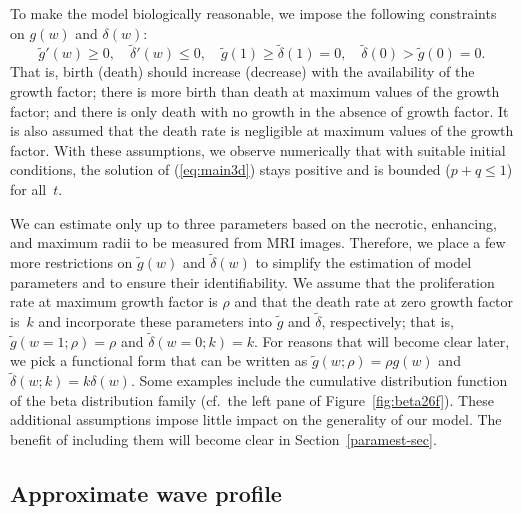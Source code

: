 \documentclass{aims}
\numberwithin{equation}{section}
\begin{document}
To make the model biologically reasonable, we impose the following constraints on $g(w)$ and $\delta(w)$:
\begin{equation}
\tilde{g}'(w)\ge0,\quad
\tilde{\delta}'(w)\le0,\quad
\tilde{g}(1)\ge\tilde{\delta}(1)=0,\quad
\tilde{\delta}(0)>\tilde{g}(0)=0.
\label{eq:1assume}
\end{equation}
That is, birth (death) should increase (decrease) with the availability of
the growth factor; there is more birth than death at maximum values of
the growth factor; and there is only death with no growth in the 
absence of growth factor. 
It is also assumed that the death rate is negligible at maximum values of
the growth factor.  With these assumptions, we observe numerically that with suitable initial conditions, the solution of (\ref{eq:main3d}) stays positive and is bounded ($p+q\le 1$) for all~$t$. 

We can estimate only up to three parameters based on the necrotic,
enhancing, and maximum radii to be measured
from MRI images.  Therefore, we place a few more
restrictions on $\tilde{g}(w)$ and $\tilde{\delta}(w)$ to simplify
the estimation of model parameters and to ensure their identifiability.
We assume that the proliferation rate at maximum growth factor is $\rho$
and that the death rate at zero growth factor
is~$k$ and incorporate these parameters into $\tilde{g}$ and
$\tilde{\delta}$, respectively; that is,
$\tilde{g}(w=1;\rho)=\rho$ and $\tilde{\delta}(w=0;k)=k$.
For reasons that will become clear later, we pick a functional form
that can be written as $\tilde{g}(w;\rho)=\rho g(w)$ and 
$\tilde{\delta}(w;k)=k\delta(w)$.
Some examples include the cumulative distribution function of the beta 
distribution family (cf.\ the left pane of Figure~\ref{fig:beta26f}).
These additional assumptions impose little impact on the generality 
of our model. The benefit of including them will become
clear in Section~\ref{paramest-sec}.

\subsection{Approximate wave profile}
\end{document}

